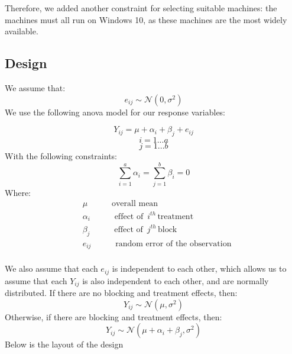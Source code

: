 \documentclass[12pt,halfline,a4paper,]{ouparticle}
\begin{document}
Therefore, we added another constraint for selecting suitable machines:
the machines must all run on Windows 10, as these machines are the most
widely available.

\hypertarget{design}{%
\subsection{Design}\label{design}}

We assume that: \[
e_{ij} \sim \mathcal{N}(0, \sigma^2)
\] We use the following anova model for our response variables:

\[
Y_{ij} = \mu + \alpha_i + \beta_j+ e_{ij}
\] \[
i = 1 ...a
\] \[
j = 1 ...b
\] With the following constraints: \[
\sum_{i=1}^a \alpha_i = \sum_{j=1}^b \beta_i =0 
\] Where: \[
\begin{aligned}
&\mu\hspace{35pt}  \text{overall mean} \\
&\alpha_i\hspace{35pt} \text{effect of }\, i^{th}\, \text{treatment}\\
&\beta_j\hspace{35pt} \text{effect of }\, j^{th}\, \text{block}\\
&e_{ij}\hspace{35pt} \text{random error of the observation}\\
\end{aligned}
\]

We also assume that each \(e_{ij}\) is independent to each other, which
allows us to assume that each \(Y_{ij}\) is also independent to each
other, and are normally distributed. If there are no blocking and
treatment effects, then: \[
Y_{ij} \sim \mathcal{N}(\mu, \sigma^2)
\] Otherwise, if there are blocking and treatment effects, then: \[
Y_{ij} \sim \mathcal{N}(\mu + \alpha_i + \beta_j, \sigma^2)
\] Below is the layout of the design
\end{document}
